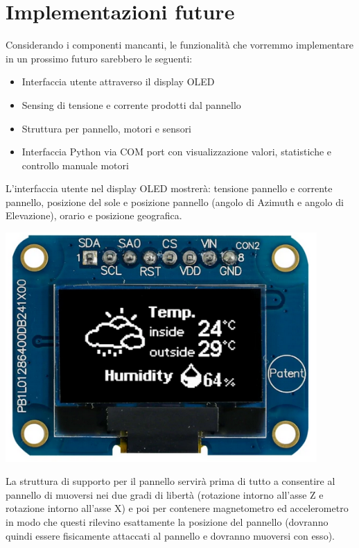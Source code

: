 \chapter{Implementazioni future}

Considerando i componenti mancanti, le funzionalità che vorremmo
implementare in un prossimo futuro sarebbero le seguenti:

\begin{itemize}
\item Interfaccia utente attraverso il display OLED
\item Sensing di tensione e corrente prodotti dal pannello
\item Struttura per pannello, motori e sensori
\item Interfaccia Python via COM port con visualizzazione valori, statistiche e controllo manuale motori
\end{itemize}

\noindent L'interfaccia utente nel display OLED mostrerà: tensione pannello e
corrente pannello, posizione del sole e posizione pannello (angolo di
Azimuth e angolo di Elevazione), orario e posizione geografica.

\begin{center}
\includegraphics[width=4.68229in,height=3.4426in]{figures/image27.png}
\captionsetup{type=figure}
\end{center}

\noindent La struttura di supporto per il pannello servirà prima di tutto a
consentire al pannello di muoversi nei due gradi di libertà (rotazione
intorno all'asse Z e rotazione intorno all'asse X) e poi per contenere
magnetometro ed accelerometro in modo che questi rilevino esattamente la
posizione del pannello (dovranno quindi essere fisicamente attaccati al
pannello e dovranno muoversi con esso).

